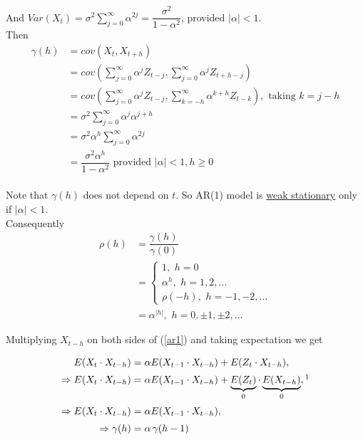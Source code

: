 \documentclass[11pt, a4paper]{article}
\numberwithin{equation}{section}
\theoremstyle{definition}
\begin{document}
And $Var(X_t) = \sigma^2 \sum \limits_{j = 0}^{\infty} \alpha^{2j} = \dfrac{\sigma^2}{1 - \alpha^2}$, provided $|\alpha| < 1$. \\

Then
\begin{align*}
\gamma(h) &= cov(X_t, X_{t+h}) \\[0.25em]
&= cov\left(\sum \limits_{j = 0}^{\infty} \alpha^j Z_{t-j}, \sum \limits_{j = 0}^{\infty} \alpha^j Z_{t+h-j}\right) \\[0.25em]
&= cov \left(\sum \limits_{j = 0}^{\infty} \alpha^j Z_{t-j}, \sum \limits_{k = - h}^{\infty} \alpha^{k+h} Z_{t-k} \right), \,\, \text{taking } k = j - h \\[0.25em]
&= \sigma^2 \sum \limits_{j = 0}^{\infty} \alpha^j \alpha^{j+h} \\[0.25em]
&= \sigma^2 \alpha^h \sum \limits_{j = 0}^{\infty} \alpha^{2j} \\[0.25em]
&= \dfrac{\sigma^2 \alpha^h}{1 - \alpha^2} \text{ provided } |\alpha| < 1, h \geq 0
\end{align*}
\\
Note that $\gamma(h)$ does not depend on $t$. So AR(1) model is \underline{weak stationary} only if $|\alpha| < 1$. \\

Consequently
\begin{align*}
\rho(h) &= \dfrac{\gamma(h)}{\gamma(0)} \\[0.25em]
&= \begin{cases} 
1, \,\, h = 0 \\
\alpha^h, \,\, h = 1, 2, \ldots \\
\rho(-h), \,\, h = -1, -2, \ldots
\end{cases} \\[0.25em]
&= \alpha^{|h|}, \,\, h = 0, \pm 1, \pm 2, \ldots
\end{align*}

Multiplying $X_{t-h}$ on both sides of (\ref{ar1}) and taking expectation we get

\begin{align}\label{ar1diffeqn}
E(X_t \cdot X_{t-h}) &= \alpha E(X_{t-1} \cdot X_{t-h}) + E(Z_{t} \cdot X_{t-h}),  \nonumber \\[0.25em]
\Rightarrow E(X_t \cdot X_{t-h}) &= \alpha E(X_{t-1} \cdot X_{t-h}) + \underbrace{E(Z_{t})}_{0} \cdot \underbrace{E(X_{t-h})}_{0},\footnotemark  \nonumber \\[0.25em]
\Rightarrow E(X_t \cdot X_{t-h}) &= \alpha E(X_{t-1} \cdot X_{t-h}),  \nonumber \\[0.25em]
\Rightarrow \gamma(h) &= \alpha \, \gamma(h-1)
\end{align}
\end{document}
